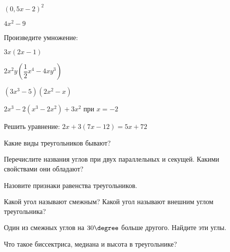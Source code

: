 \begin{listofex}
\begin{enumcols}[itemcolumns=3]
		\item \( (0,5x-2)^2 \)
		\item \( 4x^2-9 \)
	\end{enumcols}
	\item Произведите умножение:
	\begin{enumcols}[itemcolumns=3]
		\item \( 3x(2x-1) \)
		\item \( 2x^2y\left( \dfrac{1}{2}x^4-4xy^3 \right) \)
		\item \( (3x^3-5)(2x^2-x) \)
	\end{enumcols}
	\item \( 2x^3-2(x^3-2x^2)+3x^2 \) при \( x=-2 \)
	\item Решить уравнение: \( 2x+3(7x-12)=5x+72 \)
	\item Какие виды треугольников бывают?
	\item Перечислите названия углов при двух параллельных и секущей. Какими свойствами они обладают?
	\item Назовите признаки равенства треугольников.
	\item Какой угол называют смежным? Какой угол называют внешним углом треугольника?
	\item Один из смежных углов на \( 30\degree \) больше другого. Найдите эти углы.
	\item Что такое биссектриса, медиана и высота в треугольнике?
\end{listofex}